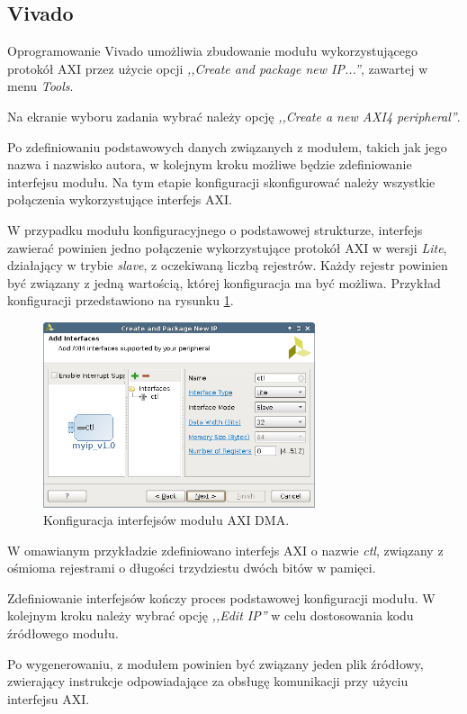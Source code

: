 \subsection{Vivado}
Oprogramowanie Vivado umożliwia zbudowanie modułu wykorzystującego protokół AXI przez użycie opcji \emph{,,Create and package new IP...''}, zawartej w menu \emph{Tools}.

Na ekranie wyboru zadania wybrać należy opcję \emph{,,Create a new AXI4 peripheral''}.

Po zdefiniowaniu podstawowych danych związanych z modułem, takich jak jego nazwa i nazwisko autora, w kolejnym kroku możliwe będzie zdefiniowanie interfejsu modułu. Na tym etapie konfiguracji skonfigurować należy wszystkie połączenia wykorzystujące interfejs AXI.

W przypadku modułu konfiguracyjnego o podstawowej strukturze, interfejs zawierać powinien jedno połączenie wykorzystujące protokół AXI w wersji \emph{Lite}, działający w trybie \emph{slave}, z oczekiwaną liczbą rejestrów. Każdy rejestr powinien być związany z jedną wartością, której konfiguracja ma być możliwa. Przykład konfiguracji przedstawiono na rysunku \ref{fig:axi-dma-interfaces-conf}.

\begin{figure}[h]
	\centering
	\includegraphics[width=8cm]{img/vivado/axi-dma-interfaces-conf.png}
	\caption{Konfiguracja interfejsów modułu AXI DMA.}
	\label{fig:axi-dma-interfaces-conf}
\end{figure}

W omawianym przykładzie zdefiniowano interfejs AXI o nazwie \emph{ctl}, związany z ośmioma rejestrami o długości trzydziestu dwóch bitów w pamięci.

Zdefiniowanie interfejsów kończy proces podstawowej konfiguracji modułu. W kolejnym kroku należy wybrać opcję \emph{,,Edit IP''} w celu dostosowania kodu źródłowego modułu.

Po wygenerowaniu, z modułem powinien być związany jeden plik źródłowy, zwierający instrukcje odpowiadające za obsługę komunikacji przy użyciu interfejsu AXI.

